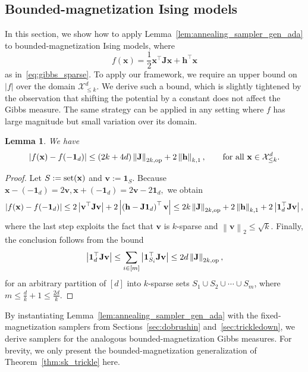 \documentclass[11pt]{article}
\newtheorem{lemma}{Lemma}
\newcommand{\defeq}{:=}
\newcommand{\norm}[1]{\left\lVert#1\right\rVert}
\newcommand{\1}{\mathbf{1}}
\newcommand{\0}{\mathbf{0}}
\newcommand{\Par}[1]{\left(#1\right)}
\newcommand{\Abs}[1]{\left|#1\right|}
\newcommand{\twonorm}[1]{\norm{#1}_2}
\newcommand{\vone}{\mathbf{1}}
\newcommand{\mj}{{\mathbf{J}}}
\newcommand{\vh}{{\mathbf{h}}}
\newcommand{\vv}{{\mathbf{v}}}
\newcommand{\vx}{{\mathbf{x}}}
\newcommand{\calX}{{\mathcal{X}}}
\newcommand{\set}{\textup{set}}
\begin{document}
\subsection{Bounded-magnetization Ising models}
\label{ssec:bm_ising}
In this section, we show how to apply Lemma~\ref{lem:annealing_sampler_gen_ada} to bounded-magnetization Ising models, where
\[
f(\vx) = \frac{1}{2}\vx^\top \mj \vx + \vh^\top \vx
\]
as in~\eqref{eq:gibbs_sparse}. To apply our framework, we require an upper bound on $|f|$ over the domain $\calX^d_{\le k}$. We derive such a bound, which is slightly tightened by the observation that shifting the potential by a constant does not affect the Gibbs measure. The same strategy can be applied in any setting where 
$f$ has large magnitude but small variation over its domain. 

\begin{lemma}\label{lem:range_ising}
    We have
    \begin{equation*}
        \Abs{f(\vx) - f(-\vone_d)}
        \le
        (2k + 4d)\norm{\mj}_{2k,\textup{op}}
        +
        2\norm{\vh}_{k,1},
        \qquad
        \text{for all } \vx \in \calX^d_{\le k}.
    \end{equation*}
\end{lemma}

\begin{proof}
    Let $S \defeq \set(\vx)$ and $\vv \defeq \vone_S$. Because \( \vx - (-\vone_d) = 2\vv, \vx + (-\vone_d) = 2\vv - 2\vone_d,\) we obtain
    \begin{equation*}
        \Abs{f(\vx) - f(-\vone_d)}
        \le
        2\Abs{\vv^\top \mj \vv}
        +
        2\Abs{\Par{\vh-\mj\vone_d}^\top\vv}
        \le
        2k\norm{\mj}_{2k,\textup{op}}
        +
        2\norm{\vh}_{k,1}
        +
        2\Abs{\vone_d^\top\mj\vv},
    \end{equation*}
    where the last step exploits the fact that $\vv$ is $k$-sparse and
    $\twonorm{\vv}\le\sqrt{k}$. Finally, the conclusion follows from the bound
    \[
        \Abs{\vone_d^\top\mj\vv}
        \le
        \sum_{i\in[m]}
        \Abs{\vone_{S_i}^\top\mj\vv}
        \le
        2d\norm{\mj}_{2k,\textup{op}},
    \]
    for an arbitrary partition of $[d]$ into $k$-sparse sets
    $S_1\cup S_2\cup\cdots\cup S_m$, where \( m\le \frac{d}{k}+1\le\frac{2d}{k}\).
\end{proof}

By instantiating Lemma~\ref{lem:annealing_sampler_gen_ada} with the fixed-magnetization samplers from Sections~\ref{sec:dobrushin} and~\ref{sec:trickledown}, we derive samplers for the analogous bounded-magnetization Gibbs measures. For brevity, we only present the bounded-magnetization generalization of Theorem~\ref{thm:sk_trickle} here.
\end{document}
